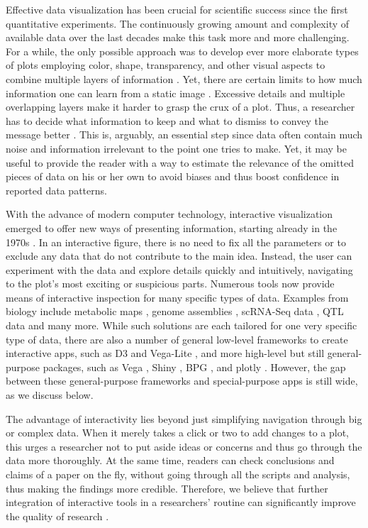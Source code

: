 \documentclass[twocolumn,10pt]{article}
\begin{document}
Effective data visualization has been crucial for scientific success since the first quantitative experiments. The continuously growing amount and complexity of available data over the last decades make this task more and more challenging. For a while, the only possible approach was to develop ever more elaborate types of plots employing color, shape, transparency, and other visual aspects to combine multiple layers of information \citep{bertin_2011, tufte_1983, wilkinson_1999}. Yet, there are certain limits to how much information one can learn from a static image \citep{hegarty_2011}. Excessive details and multiple overlapping layers make it harder to grasp the crux of a plot. Thus, a researcher has to decide what information to keep and what to dismiss to convey the message better \citep{odonoghue_2018}. This is, arguably, an essential step since data often contain much noise and information irrelevant to the point one tries to make. Yet, it may be useful to provide the reader with a way to estimate the relevance of the omitted pieces of data on his or her own to avoid biases \citep{bresciani_2009} and thus boost confidence in reported data patterns.

With the advance of modern computer technology, interactive visualization emerged to offer new ways of presenting information, starting already in the 1970s \citep{newman_1979, becker_1987}. In an interactive figure, there is no need to fix all the parameters or to exclude any data that do not contribute to the main idea. Instead, the user can experiment with the data and explore details quickly and intuitively, navigating to the plot's most exciting or suspicious parts. Numerous tools \citep{caldarola_2017} now provide means of interactive inspection for many specific types of data. Examples from biology include metabolic maps \citep{noronha_2017}, genome assemblies \citep{wick_2015}, scRNA-Seq data \citep{hillje_2020}, QTL data \citep{broman_2015} and many more. While such solutions are each tailored for one very specific type of data, there are also a number of general low-level frameworks to create interactive apps, such as D3 \citep{bostock_2011} and Vega-Lite \citep{satyanarayan_2015}, and more high-level but still general-purpose packages, such as Vega \citep{satyanarayan_2016}, Shiny \citep{shiny}, BPG \citep{p_2019}, and plotly \citep{sievert_2019, sievert_2020}. However, the gap between these general-purpose frameworks and special-purpose apps is still wide, as we discuss below.

The advantage of interactivity lies beyond just simplifying navigation through big or complex data. When it merely takes a click or two to add changes to a plot, this urges a researcher not to put aside ideas or concerns and thus go through the data more thoroughly. At the same time, readers can check conclusions and claims of a paper on the fly, without going through all the scripts and analysis, thus making the findings more credible. Therefore, we believe that further integration of interactive tools in a researchers' routine can significantly improve the quality of research \citep{shander_2016, yuk_2014}.
\end{document}
